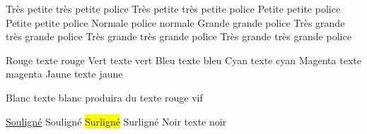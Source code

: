 

\tiny Très petite {\tiny très petite police}
\scriptsize Très petite {\scriptsize très petite police}
\footnotesize Petite {\footnotesize petite police}
\small Petite {\small petite police}
\normalsize Normale {\normalsize police normale}
\large Grande {\large grande police}
\Large Très grande {\Large très grande police}
\LARGE Très grande {\LARGE très grande police}
\huge Très grande {\huge très grande police}


\color{red} Rouge {\color{red} texte rouge}
\color{green} Vert {\color{green} texte vert}
\color{blue} Bleu {\color{blue} texte bleu}
\color{cyan} Cyan {\color{cyan} texte cyan}
\color{magenta} Magenta {\color{magenta} texte magenta}
\color{yellow} Jaune {\color{yellow} texte jaune}

\color{white} Blanc {\color{white} texte blanc}	
\color[RGB]{255,0,0} produira du texte rouge vif

\underline{Souligné} Souligné
\colorbox{yellow}{Surligné} Surligné
\color{black} Noir {\color{black} texte noir}

\newpage